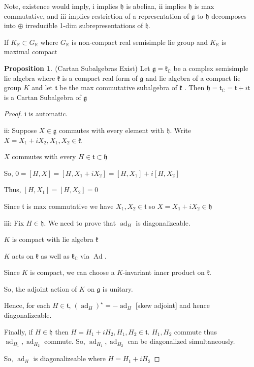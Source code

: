 \documentclass{article}
\theoremstyle{definition}
\newtheorem{proposition}{Proposition}
\newcommand{\ad}{\operatorname{ad}}
\newcommand{\Ad}{\operatorname{Ad}}
\begin{document}
Note, existence would imply, i implies \(\mathfrak{h} \) is abelian, ii implies \(\mathfrak{h} \) is max commutative, and iii implies restriction of a representation of \(\mathfrak{g} \) to \(\mathfrak{h} \) decomposes into \(\oplus \) irreducible 1-dim subrepresentations of \(\mathfrak{h} \). 

If \(K_{\mathbb{R}}\subset G_{\mathbb{R}}\) where \(G_{\mathbb{R} }\) is non-compact real semisimple lie group and \(K_{\mathbb{R} }\) is maximal compact

\begin{proposition}
    (Cartan Subalgebras Exist) Let \(\mathfrak{g} = \mathfrak{k}_{\mathbb{C}}\) be a complex semisimple lie algebra where \(\mathfrak{k} \) is a compact real form of \(\mathfrak{g} \) and lie algebra of a compact lie group \(K\) and let \(\mathfrak{t} \) be the max commutative subalgebra of \(\mathfrak{k} \) . Then \(\mathfrak{h} =\mathfrak{t} _{\mathbb{C} }=\mathfrak{t} +i\mathfrak{t} \) is a Cartan Subalgebra of \(\mathfrak{g} \)  
\end{proposition}

\begin{proof}
    i is automatic.

    ii: Suppose \(X\in \mathfrak{g} \) commutes with every element with \(\mathfrak{h} \). Write \(X=X_1 + i X_2, X_1,X_2\in \mathfrak{k} \).
    
    \(X\) commutes with every \(H\in \mathfrak{t} \subset \mathfrak{h} \) 

    So, \(0=[H,X]=[H,X_1 + i X_2]=[H,X_1]+i[H,X_2]\) 

    Thus, \([H,X_1]=[H,X_2]=0\)
    
    Since \(\mathfrak{t} \) is max commutative we have \(X_1,X_2\in \mathfrak{t} \) so \(X=X_1 + iX_2\in \mathfrak{h} \)
    
    iii: Fix \(H\in \mathfrak{h} \). We need to prove that \(\ad_H\) is diagonalizeable.
    
    \(K\) is compact with lie algebra \(\mathfrak{k} \)

    \(K\) acts on \(\mathfrak{k} \) as well as \(\mathfrak{k} _{\mathbb{C} }\) via \(\Ad\).
    
    Since \(K\) is compact, we can choose a \(K\)-invariant inner product on \(\mathfrak{k} \).

    So, the adjoint action of \(K\) on \(\mathfrak{g} \) is unitary.

    Hence, for each \(H\in \mathfrak{t} \), \((\ad_H)^{\star} =-\ad_H\) [skew adjoint] and hence diagonalizeable.
    
    Finally, if \(H\in \mathfrak{h} \) then \(H=H_1 + i H_2, H_1,H_2\in \mathfrak{t}   \). \(H_1,H_2\) commute thus \(\ad_{H_1},\ad_{H_2}\) commute. So, \(\ad_{H_1},\ad_{H_2}\) can be diagonalized simultaneously.

    So, \(\ad_H\) is diagonalizeable where \(H=H_1 + i H_2\)  

\end{proof}
\end{document}
